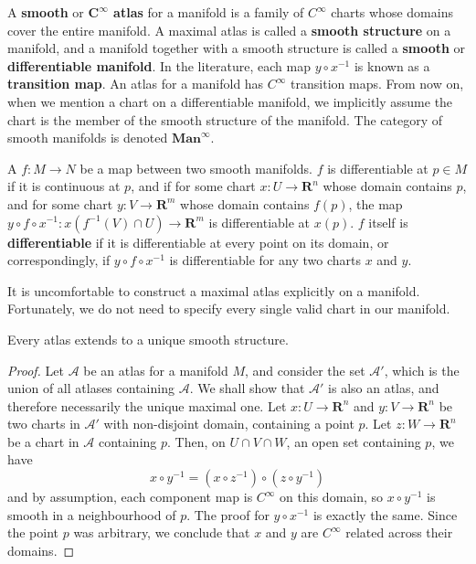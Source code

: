 A {\bf smooth} or {\bf $\mathbf{C^\infty}$ atlas} for a manifold is a family of $C^\infty$ charts whose domains cover the entire manifold. A maximal atlas is called a {\bf smooth structure} on a manifold, and a manifold together with a smooth structure is called a {\bf smooth} or {\bf differentiable manifold}. In the literature, each map $y \circ x^{-1}$ is known as a {\bf transition map}. An atlas for a manifold has $C^\infty$ transition maps. From now on, when we mention a chart on a differentiable manifold, we implicitly assume the chart is the member of the smooth structure of the manifold. The category of smooth manifolds is denoted $\textbf{Man}^\infty$.

A $f:M \to N$ be a map between two smooth manifolds. $f$ is differentiable at $p \in M$ if it is continuous at $p$, and if for some chart $x:U \to \mathbf{R}^n$ whose domain contains $p$, and for some chart $y:V \to \mathbf{R}^m$ whose domain contains $f(p)$, the map $y \circ f \circ x^{-1}:x(f^{-1}(V) \cap U) \to \mathbf{R}^m$ is differentiable at $x(p)$. $f$ itself is {\bf differentiable} if it is differentiable at every point on its domain, or correspondingly, if $y \circ f \circ x^{-1}$ is differentiable for any two charts $x$ and $y$.

It is uncomfortable to construct a maximal atlas explicitly on a manifold. Fortunately, we do not need to specify every single valid chart in our manifold.

\begin{lemma}
    Every atlas extends to a unique smooth structure.
\end{lemma}
\begin{proof}
Let $\mathcal{A}$ be an atlas for a manifold $M$, and consider the set $\mathcal{A}'$, which is the union of all atlases containing $\mathcal{A}$. We shall show that $\mathcal{A}'$ is also an atlas, and therefore necessarily the unique maximal one. Let $x:U \to \mathbf{R}^n$ and $y:V \to \mathbf{R}^n$ be two charts in $\mathcal{A}'$ with non-disjoint domain, containing a point $p$. Let $z:W \to \mathbf{R}^n$ be a chart in $\mathcal{A}$ containing $p$. Then, on $U \cap V \cap W$, an open set containing $p$, we have
%
\[ x \circ y^{-1} = (x \circ z^{-1}) \circ (z \circ y^{-1}) \]
%
and by assumption, each component map is $C^\infty$ on this domain, so $x \circ y^{-1}$ is smooth in a neighbourhood of $p$. The proof for $y \circ x^{-1}$ is exactly the same. Since the point $p$ was arbitrary, we conclude that $x$ and $y$ are $C^\infty$ related across their domains.
\end{proof}

